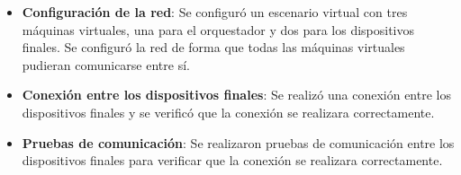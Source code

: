 
\begin{itemize}
    \item \textbf{Configuración de la red}: Se configuró un escenario virtual con tres máquinas virtuales, una para el orquestador y dos para los dispositivos finales. Se configuró la red de forma que todas las máquinas virtuales pudieran comunicarse entre sí.
    
    \item \textbf{Conexión entre los dispositivos finales}: Se realizó una conexión entre los dispositivos finales y se verificó que la conexión se realizara correctamente.
    \item \textbf{Pruebas de comunicación}: Se realizaron pruebas de comunicación entre los dispositivos finales para verificar que la conexión se realizara correctamente.
\end{itemize}

